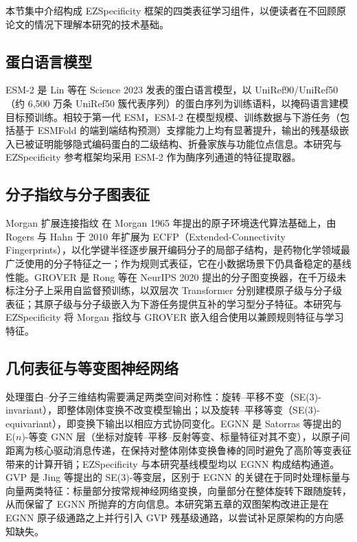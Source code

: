 本节集中介绍构成 EZSpecificity 框架的四类表征学习组件，以便读者在不回顾原论文的情况下理解本研究的技术基础。

\subsection{蛋白语言模型}
\label{subsec:rep-plm}

ESM-2\cite{ESM2023} 是 Lin 等在 Science 2023 发表的蛋白语言模型，以 UniRef90/UniRef50（约 6{,}500 万条 UniRef50 簇代表序列）的蛋白序列为训练语料，以掩码语言建模目标预训练。相较于第一代 ESM\cite{ESM2021}，ESM-2 在模型规模、训练数据与下游任务（包括基于 ESMFold 的端到端结构预测）支撑能力上均有显著提升，输出的残基级嵌入已被证明能够隐式编码蛋白的二级结构、折叠家族与功能位点信息。本研究与 EZSpecificity 参考框架均采用 ESM-2 作为酶序列通道的特征提取器。

\subsection{分子指纹与分子图表征}
\label{subsec:rep-mol}

Morgan 扩展连接指纹\cite{ECFP2010} 在 Morgan 1965 年提出的原子环境迭代算法基础上，由 Rogers 与 Hahn 于 2010 年扩展为 ECFP（Extended-Connectivity Fingerprints），以化学键半径逐步展开编码分子的局部子结构，是药物化学领域最广泛使用的分子特征之一；作为规则式表征，它在小数据场景下仍具备稳定的基线性能。GROVER\cite{GROVER2020} 是 Rong 等在 NeurIPS 2020 提出的分子图变换器，在千万级未标注分子上采用自监督预训练，以双层次 Transformer 分别建模原子级与分子级表征；其原子级与分子级嵌入为下游任务提供互补的学习型分子特征。本研究与 EZSpecificity 将 Morgan 指纹与 GROVER 嵌入组合使用以兼顾规则特征与学习特征。

\subsection{几何表征与等变图神经网络}
\label{subsec:rep-geom}

处理蛋白--分子三维结构需要满足两类空间对称性：旋转--平移不变（SE(3)-invariant），即整体刚体变换不改变模型输出；以及旋转--平移等变（SE(3)-equivariant），即变换下输出以相应方式协同变化。EGNN\cite{EGNN2021} 是 Satorras 等提出的 E($n$)-等变 GNN 层（坐标对旋转--平移--反射等变、标量特征对其不变），以原子间距离为核心驱动消息传递，在保持对整体刚体变换鲁棒的同时避免了高阶等变表征带来的计算开销；EZSpecificity 与本研究基线模型均以 EGNN 构成结构通道。GVP\cite{GVP2021,GVPMacro2021} 是 Jing 等提出的 SE(3)-等变层，区别于 EGNN 的关键在于同时处理标量与向量两类特征：标量部分按常规神经网络变换，向量部分在整体旋转下跟随旋转，从而保留了 EGNN 所抛弃的方向信息。本研究第五章的双图架构改进正是在 EGNN 原子级通路之上并行引入 GVP 残基级通路，以尝试补足原架构的方向感知缺失。

